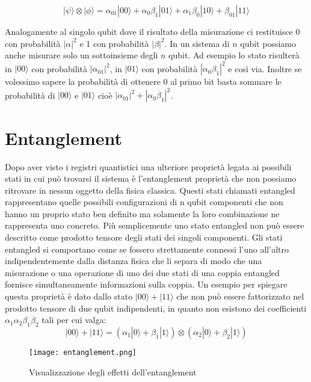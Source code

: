 \[
  | \psi \rangle \otimes | \phi \rangle 
  = \alpha _{01} | 00 \rangle 
  + \alpha _0 \beta _1 | 01 \rangle 
  + \alpha _1 \beta _0 | 10 \rangle 
  +  \beta _{01} | 11 \rangle  
\]

Analogamente al singolo qubit dove il risultato della misurazione ci restituisce 0 con probabilità \( |\alpha|^2 \) e 1 con probabilità \( |\beta|^2 \). In un sistema di \(n\) qubit possiamo anche misurare solo un sottoinsieme degli \(n\) qubit. Ad esempio lo stato risulterà in \(| 00 \rangle \) con probabilità \( | \alpha _{01}|^2 \), in \(| 01 \rangle \) con probabilità \( | \alpha _0 \beta _1|^2 \) e così via. Inoltre se volessimo sapere la probabilità di ottenere 0 al primo bit basta sommare le probabilità di \(| 00 \rangle \) e \(| 01 \rangle \) cioè \( |\alpha _{01}|^2 + |\alpha _0 \beta _1|^2 \).

\section{Entanglement}
Dopo aver visto i registri quantistici una ulteriore proprietà legata ai possibili stati in cui può trovarsi il sistema è l'entanglement proprietà che non possiamo ritrovare in nessun oggetto della fisica classica. Questi stati chiamati entangled rappresentano quelle possibili configurazioni di n qubit componenti che non hanno un proprio stato ben definito ma solamente la loro combinazione ne rappresenta uno concreto. Più semplicemente uno stato entangled non può essere descritto come prodotto tensore degli stati dei singoli componenti.
Gli stati entangled si comportano come se fossero strettamente connessi l'uno all'altro indipendentemente dalla distanza fisica che li separa di modo che una misurazione o una operazione di uno dei due stati di una coppia entangled fornisce simultaneamente informazioni sulla coppia.
Un esempio per spiegare questa proprietà è dato dallo stato \( | 00 \rangle + | 11 \rangle \) che non può essere fattorizzato nel prodotto tensore di due qubit indipendenti, in quanto non esistono dei coefficienti \( \alpha _1 \alpha _2 \beta _1 \beta _2 \) tali per cui valga:
\[
  | 00 \rangle + | 11 \rangle
  = ( \alpha _1 | 0 \rangle + \beta _1 | 1 \rangle) \otimes ( \alpha _2 | 0 \rangle + \beta _2 | 1 \rangle)  
\]

\begin{figure}[h]
  \centering
  \texttt{[image: entanglement.png]}
  \caption{Visualizzazione degli effetti dell'entanglement}
  \label{fig:entanglement}
\end{figure}

